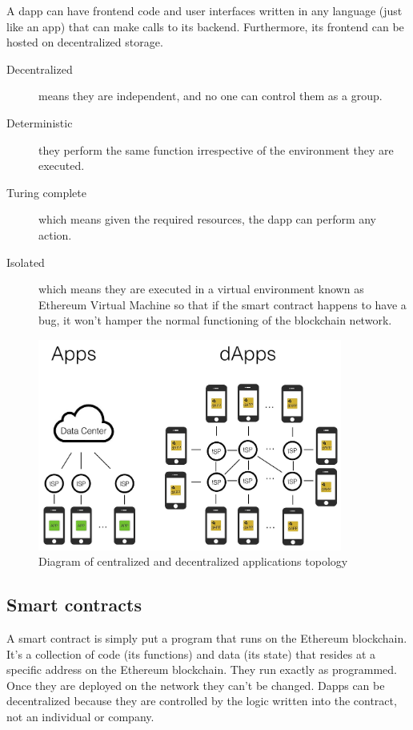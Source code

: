 A dapp can have frontend code and user interfaces written in any language (just like an app) that can make calls to its backend. Furthermore, its frontend can be hosted on decentralized storage.

\begin{description}
\item[Decentralized] means they are independent, and no one can control them as a group.
\item[Deterministic] they perform the same function irrespective of the environment they are executed.
\item[Turing complete] which means given the required resources, the dapp can perform any action.
\item[Isolated] which means they are executed in a virtual environment known as Ethereum Virtual Machine so that if the smart contract happens to have a bug, it won’t hamper the normal functioning of the blockchain network.
\end{description}

\begin{figure}[H]
	\centering
		\includegraphics[width=10cm]{images/chapter2/dapps.png}
		\caption{{\footnotesize Diagram of centralized and decentralized applications topology}}
\end{figure}

\subsection{Smart contracts}

A smart contract is simply put a program that runs on the Ethereum blockchain. It's a collection of code (its functions) and data (its state) that resides at a specific address on the Ethereum blockchain. They run exactly as programmed. Once they are deployed on the network they can't be changed. Dapps can be decentralized because they are controlled by the logic written into the contract, not an individual or company.

